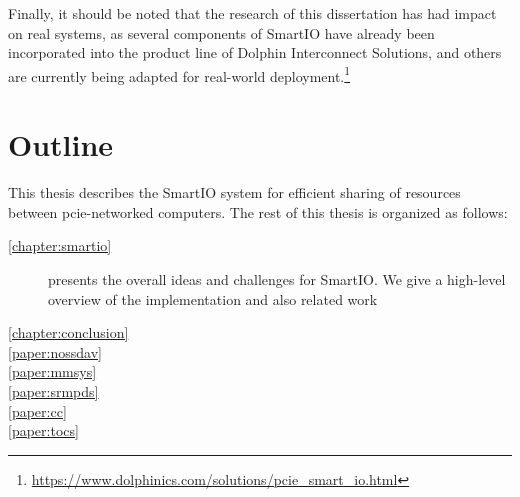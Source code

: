 %
Finally, it should be noted that the research of this dissertation has had impact on real systems, as several components of SmartIO have already been incorporated into the product line of Dolphin Interconnect Solutions, and others are currently being adapted for real-world deployment.\footnote{{\url{https://www.dolphinics.com/solutions/pcie_smart_io.html}}}


\section{Outline}
This thesis describes the SmartIO system for efficient sharing of resources between \gls{pcie}-networked computers.
%
The rest of this thesis is organized as follows:
\begin{description}
    \item[\cref{chapter:smartio}]
        presents the overall ideas and challenges for SmartIO. 
        We give a high-level overview of the implementation and 
        also related work

    \item[\cref{chapter:conclusion}]

    \item[\cref{paper:nossdav}]

    \item[\cref{paper:mmsys}]

    \item[\cref{paper:srmpds}]

    \item[\cref{paper:cc}]

    \item[\cref{paper:tocs}]
\end{description}

